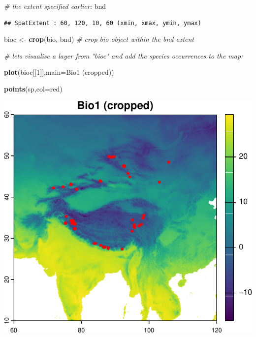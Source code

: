 \documentclass[
]{article}
\newenvironment{Shaded}{\begin{snugshade}}{\end{snugshade}}
\newcommand{\AttributeTok}[1]{\textcolor[rgb]{0.13,0.29,0.53}{#1}}
\newcommand{\CommentTok}[1]{\textcolor[rgb]{0.56,0.35,0.01}{\textit{#1}}}
\newcommand{\DecValTok}[1]{\textcolor[rgb]{0.00,0.00,0.81}{#1}}
\newcommand{\FunctionTok}[1]{\textcolor[rgb]{0.13,0.29,0.53}{\textbf{#1}}}
\newcommand{\NormalTok}[1]{#1}
\newcommand{\OtherTok}[1]{\textcolor[rgb]{0.56,0.35,0.01}{#1}}
\newcommand{\StringTok}[1]{\textcolor[rgb]{0.31,0.60,0.02}{#1}}
\begin{document}
\begin{Shaded}
\begin{Highlighting}[]
\CommentTok{\# the extent specified earlier:}
\NormalTok{bnd}
\end{Highlighting}
\end{Shaded}

\begin{verbatim}
## SpatExtent : 60, 120, 10, 60 (xmin, xmax, ymin, ymax)
\end{verbatim}

\begin{Shaded}
\begin{Highlighting}[]
\NormalTok{bioc }\OtherTok{\textless{}{-}} \FunctionTok{crop}\NormalTok{(bio, bnd) }\CommentTok{\# crop bio object within the bnd extent}

\CommentTok{\# let\textquotesingle{}s visualise a layer from "bioc" and add the species occurrences to the map:}

\FunctionTok{plot}\NormalTok{(bioc[[}\DecValTok{1}\NormalTok{]],}\AttributeTok{main=}\StringTok{\textquotesingle{}Bio1 (cropped)\textquotesingle{}}\NormalTok{)}

\FunctionTok{points}\NormalTok{(sp,}\AttributeTok{col=}\StringTok{\textquotesingle{}red\textquotesingle{}}\NormalTok{)}
\end{Highlighting}
\end{Shaded}

\includegraphics{sdm_R_files/figure-latex/unnamed-chunk-4-1.pdf}
\end{document}
